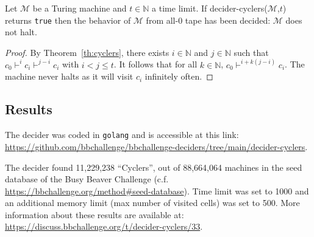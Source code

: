 \begin{corollary}
  Let $\mathcal{M}$ be a Turing machine and $t \in \mathbb{N}$ a time limit. If {\sc decider-cyclers}($\mathcal{M}$,$t$) returns \texttt{true} then the behavior of $\mathcal{M}$ from all-0 tape has been decided: $\mathcal{M}$ does not halt.
\end{corollary}
\begin{proof}
  By Theorem~\ref{th:cyclers}, there exists $i\in\mathbb{N}$ and $j\in\mathbb{N}$ such that $c_0 \vdash^i c_i \vdash^{j-i} c_i$ with $i < j \leq t$. It follows that for all $k\in\mathbb{N}$, $c_0 \vdash^{i+k(j-i)} c_i$. The machine never halts as it will visit $c_i$ infinitely often.
\end{proof}

\subsection{Results}

The decider was coded in \texttt{golang} and is accessible at this link: \url{https://github.com/bbchallenge/bbchallenge-deciders/tree/main/decider-cyclers}.

The decider found 11,229,238 ``Cyclers'', out of 88,664,064 machines in the seed database of the Busy Beaver Challenge (c.f. \url{https://bbchallenge.org/method#seed-database}). Time limit was set to 1000 and an additional memory limit (max number of visited cells) was set to 500. More information about these results are available at: \url{https://discuss.bbchallenge.org/t/decider-cyclers/33}.
